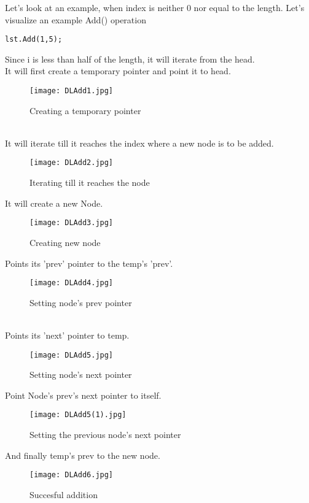 \documentclass[11pt,fleqn]{book} %
\begin{document}
\begin{example}
Let's look at an example, when index is neither 0 nor equal to the length.
Let's visualize an example Add() operation\\
\begin{lstlisting}
lst.Add(1,5);
\end{lstlisting}
Since i is less than half of the length, it will iterate from the head.\\
It will first create a temporary pointer and point it to head.
\begin{figure}[H]
	\centering
	\texttt{[image: DLAdd1.jpg]}
	\caption{Creating a temporary pointer}
\end{figure} ~\\
It will iterate till it reaches the index where a new node is to be added.
\begin{figure}[H]
	\centering
	\texttt{[image: DLAdd2.jpg]}
	\caption{Iterating till it reaches the node}
\end{figure}
It will create a new Node.
\begin{figure}[H]
	\centering
	\texttt{[image: DLAdd3.jpg]}
	\caption{Creating new node}
\end{figure}
Points its 'prev' pointer to the temp's 'prev'.
\begin{figure}[H]
	\centering
	\texttt{[image: DLAdd4.jpg]}
	\caption{Setting node's prev pointer}
\end{figure}~\\
Points its 'next' pointer to temp.
\begin{figure}[H]
	\centering
	\texttt{[image: DLAdd5.jpg]}
	\caption{Setting node's next pointer}
\end{figure}
Point Node's prev's next pointer to itself.
\begin{figure}[H]
	\centering
	\texttt{[image: DLAdd5(1).jpg]}
	\caption{Setting the previous node's next pointer}
\end{figure}
And finally temp's prev to the new node.
\begin{figure}[H]
	\centering
	\texttt{[image: DLAdd6.jpg]}
	\caption{Succesful addition}
\end{figure}
\end{example}
\end{document}
